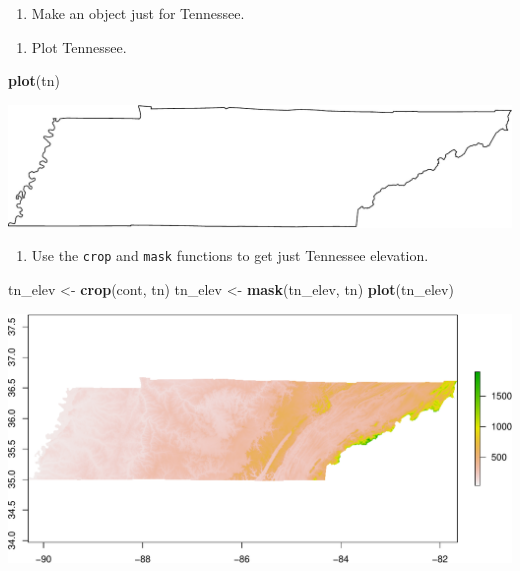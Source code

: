 \documentclass[
]{book}
\newenvironment{Shaded}{\begin{snugshade}}{\end{snugshade}}
\newcommand{\DecValTok}[1]{\textcolor[rgb]{0.00,0.00,0.81}{#1}}
\newcommand{\KeywordTok}[1]{\textcolor[rgb]{0.13,0.29,0.53}{\textbf{#1}}}
\newcommand{\NormalTok}[1]{#1}
\newcommand{\OperatorTok}[1]{\textcolor[rgb]{0.81,0.36,0.00}{\textbf{#1}}}
\newcommand{\StringTok}[1]{\textcolor[rgb]{0.31,0.60,0.02}{#1}}
\providecommand{\tightlist}{%
  \setlength{\itemsep}{0pt}\setlength{\parskip}{0pt}}
\begin{document}
\begin{enumerate}
\def\labelenumi{\arabic{enumi}.}
\setcounter{enumi}{12}
\tightlist
\item
  Make an object just for Tennessee.
\end{enumerate}

\begin{Shaded}
\end{Shaded}

\begin{enumerate}
\def\labelenumi{\arabic{enumi}.}
\setcounter{enumi}{13}
\tightlist
\item
  Plot Tennessee.
\end{enumerate}

\begin{Shaded}
\begin{Highlighting}[]
\KeywordTok{plot}\NormalTok{(tn)}
\end{Highlighting}
\end{Shaded}

\includegraphics{figures/unnamed-chunk-421-1.pdf}

\begin{enumerate}
\def\labelenumi{\arabic{enumi}.}
\setcounter{enumi}{14}
\tightlist
\item
  Use the \texttt{crop} and \texttt{mask} functions to get just Tennessee elevation.
\end{enumerate}

\begin{Shaded}
\begin{Highlighting}[]
\NormalTok{tn_elev <-}\StringTok{ }\KeywordTok{crop}\NormalTok{(cont, tn)}
\NormalTok{tn_elev <-}\StringTok{ }\KeywordTok{mask}\NormalTok{(tn_elev, tn)}
\KeywordTok{plot}\NormalTok{(tn_elev)}
\end{Highlighting}
\end{Shaded}

\includegraphics{figures/unnamed-chunk-422-1.pdf}
\end{document}
